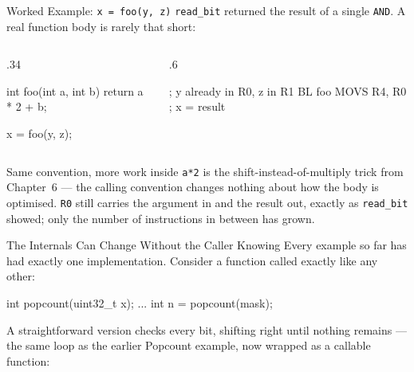 \documentclass[9pt,aspectratio=169,xcolor=table]{beamer}
\begin{document}
\begin{frame}[fragile]{Worked Example: \texttt{x = foo(y, z)}}
    \leavevmode
    {\small \texttt{read\_bit} returned the result of a single \texttt{AND}.
    A real function body is rarely that short:}

    \vspace{1mm}
    \begin{columns}[T]
    \begin{column}{.34\textwidth}
        \begin{cc}[basicstyle=\normalsize\ttfamily]
int foo(int a, int b) {
    return a * 2 + b;
}

x = foo(y, z);
        \end{cc}
    \end{column}
    \begin{column}{.6\textwidth}

        \vspace{2mm}
        \begin{asm}[basicstyle=\normalsize\ttfamily]
; y already in R0, z in R1
     BL    foo
     MOVS  R4, R0        ; x = result
        \end{asm}
    \end{column}
    \end{columns}

    \vspace{3mm}
\begin{block}{Same convention, more work inside} \texttt{a*2} is the shift-instead-of-multiply trick from Chapter~6 --- the calling convention changes nothing about how the body is optimised. \texttt{R0} still carries the argument in and the result out, exactly as \texttt{read\_bit} showed; only the number of instructions in between has grown. \end{block}
\end{frame}

\begin{frame}[fragile]{The Internals Can Change Without the Caller Knowing}
    \leavevmode
    {\small Every example so far has had exactly one implementation. Consider
    a function called exactly like any other:}

    \begin{cc}
int popcount(uint32_t x);
...
int n = popcount(mask);
    \end{cc}

    \vspace{2mm}
    {\small A straightforward version checks every bit, shifting right until
    nothing remains --- the same loop as the earlier Popcount example, now
    wrapped as a callable function:}

\end{frame}
\end{document}
